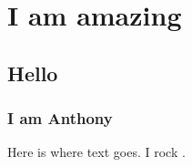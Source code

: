 \chapter{I am amazing}
    \section{Hello}
        \subsection{I am Anthony}
        
        Here is where text goes. I rock \cite{kelly2004transplanted}.
        
